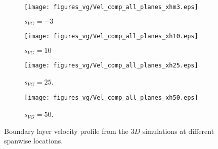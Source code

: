 \begin{figure}[h!]
    \centering
    \captionsetup{justification=centering}
    \begin{subfigure}[b]{0.48\textwidth}
    \captionsetup{justification=centering}
        \texttt{[image: figures\_vg/Vel\_comp\_all\_planes\_xhm3.eps]}
        \caption{$s_{VG} = -3$}
        \label{fig:allplanxhm3}
    \end{subfigure}
    \begin{subfigure}[b]{0.48\textwidth}
    \captionsetup{justification=centering}
        \texttt{[image: figures\_vg/Vel\_comp\_all\_planes\_xh10.eps]}
        \caption{$s_{VG} = 10$}
        \label{fig:allplanxh10}
    \end{subfigure}
    \begin{subfigure}[b]{0.48\textwidth}
    \centering
    \captionsetup{justification=centering}
        \texttt{[image: figures\_vg/Vel\_comp\_all\_planes\_xh25.eps]}
        \caption{$s_{VG} = 25$.}
        \label{fig:allplanxh25}
    \end{subfigure}
    \begin{subfigure}[b]{0.48\textwidth}
    \centering
    \captionsetup{justification=centering}
        \texttt{[image: figures\_vg/Vel\_comp\_all\_planes\_xh50.eps]}
        \caption{$s_{VG} = 50$.}
        \label{fig:allplanxh50}
    \end{subfigure}
    \caption{Boundary layer velocity profile from the $3D$ simulations at different spanwise locations.}
    \label{fig:allplan3d}
\end{figure}

